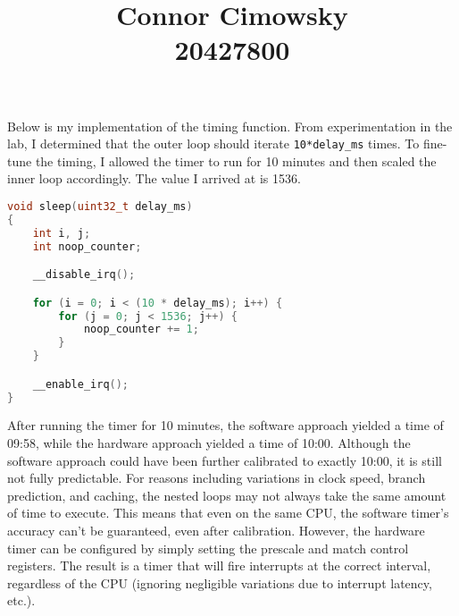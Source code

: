 \documentclass[11pt]{article}
\title{Connor Cimowsky\protect\\20427800}
\date{}
\begin{document}
\maketitle

Below is my implementation of the timing function. From experimentation in the
lab, I determined that the outer loop should iterate \texttt{10*delay\_ms}
times. To fine-tune the timing, I allowed the timer to run for 10 minutes and
then scaled the inner loop accordingly. The value I arrived at is 1536.

\begin{lstlisting}[language=c, frame=single]
void sleep(uint32_t delay_ms)
{
    int i, j;
    int noop_counter;

    __disable_irq();

    for (i = 0; i < (10 * delay_ms); i++) {
        for (j = 0; j < 1536; j++) {
            noop_counter += 1;
        }
    }

    __enable_irq();
}
\end{lstlisting}

\vspace{1em}

After running the timer for 10 minutes, the software approach yielded a time of
09:58, while the hardware approach yielded a time of 10:00. Although the
software approach could have been further calibrated to exactly 10:00, it is
still not fully predictable. For reasons including variations in clock speed,
branch prediction, and caching, the nested loops may not always take the same
amount of time to execute. This means that even on the same CPU, the software
timer's accuracy can't be guaranteed, even after calibration. However, the
hardware timer can be configured by simply setting the prescale and match
control registers. The result is a timer that will fire interrupts at the
correct interval, regardless of the CPU (ignoring negligible variations due to
interrupt latency, etc.).
\end{document}
